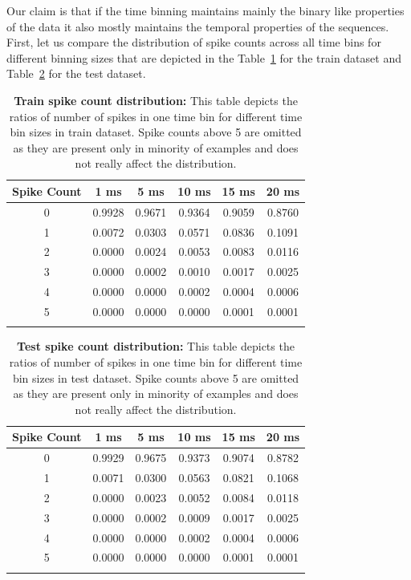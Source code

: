 Our claim is that if the time binning maintains mainly the binary like properties of the data it also mostly maintains the temporal properties of the sequences. First, let us compare the distribution of spike counts across all time bins for different binning sizes that are depicted in the Table~\ref{tab:train_bin_count_distribution} for the train dataset and Table~\ref{tab:test_bin_count_distribution} for the test dataset.

\begin{table}
    \centering\footnotesize\sf
    \begin{tabular}{cccccc}
    \toprule
        Spike Count & 1 ms & 5 ms & 10 ms & 15 ms & 20 ms \\ \hline
        0 & 0.9928 & 0.9671 & 0.9364 & 0.9059 & 0.8760 \\
        1 & 0.0072 & 0.0303 & 0.0571 & 0.0836 & 0.1091 \\
        2 & 0.0000 & 0.0024 & 0.0053 & 0.0083 & 0.0116 \\
        3 & 0.0000 & 0.0002 & 0.0010 & 0.0017 & 0.0025 \\
        4 & 0.0000 & 0.0000 & 0.0002 & 0.0004 & 0.0006 \\
        5 & 0.0000 & 0.0000 & 0.0000 & 0.0001 & 0.0001 \\
    \addlinespace %
    \bottomrule
    \end{tabular}
    \caption{\textbf{Train spike count distribution:} This table depicts the ratios of number of spikes in one time bin for different time bin sizes in train dataset. Spike counts above 5 are omitted as they are present only in minority of examples and does not really affect the distribution.}
    \label{tab:train_bin_count_distribution}
\end{table}
    

\begin{table}
    \centering\footnotesize\sf
    \begin{tabular}{cccccc}
    \toprule
        Spike Count & 1 ms & 5 ms & 10 ms & 15 ms & 20 ms \\ \hline
        0 & 0.9929 & 0.9675 & 0.9373 & 0.9074 & 0.8782 \\
        1 & 0.0071 & 0.0300 & 0.0563 & 0.0821 & 0.1068 \\
        2 & 0.0000 & 0.0023 & 0.0052 & 0.0084 & 0.0118 \\
        3 & 0.0000 & 0.0002 & 0.0009 & 0.0017 & 0.0025 \\
        4 & 0.0000 & 0.0000 & 0.0002 & 0.0004 & 0.0006 \\
        5 & 0.0000 & 0.0000 & 0.0000 & 0.0001 & 0.0001 \\
    \addlinespace %
    \bottomrule
    \end{tabular}
    \caption{\textbf{Test spike count distribution:} This table depicts the ratios of number of spikes in one time bin for different time bin sizes in test dataset. Spike counts above 5 are omitted as they are present only in minority of examples and does not really affect the distribution.}
    \label{tab:test_bin_count_distribution}
\end{table}


